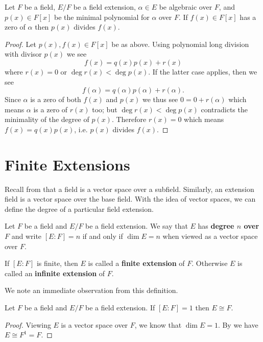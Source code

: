 \begin{corollary}\label{corollary-minimal-polynomial-divides-polynomial-with-same-root}
    Let $F$ be a field, $E/F$ be a field extension, $\alpha \in E$ be algebraic over $F$, and $p(x) \in F[x]$ be the minimal polynomial for $\alpha$ over $F$. If $f(x) \in F[x]$ has a zero of $\alpha$ then $p(x)$ divides $f(x)$.
\end{corollary}
\begin{proof}
    Let $p(x), f(x) \in F[x]$ be as above. Using polynomial long division with divisor $p(x)$ we see
    \[
        f(x) = q(x)p(x) + r(x)
    \]
    where $r(x) = 0$ or $\deg r(x) < \deg p(x)$. If the latter case applies, then we see
    \[
        f(\alpha) = q(\alpha)p(\alpha) + r(\alpha).
    \]
    Since $\alpha$ is a zero of both $f(x)$ and $p(x)$ we thus see $0 = 0 + r(\alpha)$ which means $\alpha$ is a zero of $r(x)$ too; but $\deg r(x) < \deg p(x)$ contradicts the minimality of the degree of $p(x)$. Therefore $r(x) = 0$ which means $f(x) = q(x)p(x)$, i.e. $p(x)$ divides $f(x)$.
\end{proof}

\section{Finite Extensions}
Recall from  that a field is a vector space over a subfield. Similarly, an extension field is a vector space over the base field. With the idea of vector spaces, we can define the degree of a particular field extension.

\begin{definition}
    Let $F$ be a field and $E/F$ be a field extension. We say that $E$ has \textbf{degree $n$ over $F$} and write $[E:F] = n$ if and only if $\dim E = n$ when viewed as a vector space over $F$.

    If $[E:F]$ is finite, then $E$ is called a \textbf{finite extension} of $F$. Otherwise $E$ is called an \textbf{infinite extension} of $F$.
\end{definition}

We note an immediate observation from this definition.
\begin{proposition}\label{prop-finite-extension-of-degree-1-means-extension-isomorphic-to-base-field}
    Let $F$ be a field and $E/F$ be a field extension. If $[E:F] = 1$ then $E \cong F$.
\end{proposition}
\begin{proof}
    Viewing $E$ is a vector space over $F$, we know that $\dim E = 1$. By  we have $E\cong F^1 = F$.
\end{proof}

